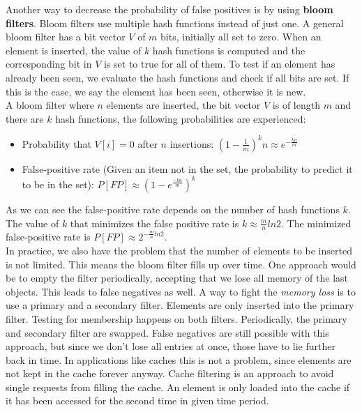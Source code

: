 Another way to decrease the probability of false positives is by using \textbf{bloom filters}. Bloom filters use multiple hash functions instead of just one. A general bloom filter has a bit vector $V$ of $m$ bits, initially all set to zero. When an element is inserted, the value of $k$ hash functions is computed and the corresponding bit in $V$ is set to true for all of them. To test if an element has already been seen, we evaluate the hash functions and check if all bits are set. If this is the case, we say the element has been seen, otherwise it is new. \\
A bloom filter where $n$ elements are inserted, the bit vector $V$ is of length $m$ and there are $k$ hash functions, the following probabilities are experienced:
\begin{itemize}
\item Probability that $V[i] = 0$ after $n$ insertions: $(1 - \frac{1}{m})^kn \approx e^{-\frac{kn}{m}}$
\item False-positive rate (Given an item not in the set, the probability to predict it to be in the set): $P[FP] \approx (1 - e^{\frac{-kn}{m}})^k$
\end{itemize}
As we can see the false-positive rate depends on the number of hash functions $k$. The value of $k$ that minimizes the false positive rate is $k \approx \frac{m}{n}ln 2$. The minimized false-positive rate is $P[FP] \approx 2^{-\frac{m}{n}ln2}$.\vspace{.3cm}\\

In practice, we also have the problem that the number of elements to be inserted is not limited. This means the bloom filter fills up over time. One approach would be to empty the filter periodically, accepting that we lose all memory of the last objects. This leads to false negatives as well. A way to fight the \textit{memory loss} is to use a primary and a secondary filter. Elements are only inserted into the primary filter. Testing for membership happens on both filters. Periodically, the primary and secondary filter are swapped. False negatives are still possible with this approach, but since we don't lose all entries at once, those have to lie further back in time. In applications like caches this is not a problem, since elements are not kept in the cache forever anyway. Cache filtering is an approach to avoid single requests from filling the cache. An element is only loaded into the cache if it has been accessed for the second time in given time period.

